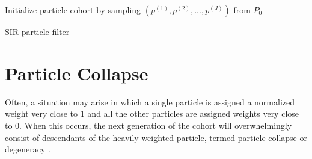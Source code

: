     \begin{algorithm}

        \BlankLine

        \DontPrintSemicolon


        \BlankLine

        Initialize particle cohort by sampling $(p^{(1)}, p^{(2)}, ..., p^{(J)})$ from $P_0$

        \BlankLine


        \BlankLine


        \BlankLine

        \caption{SIR particle filter \label{pfsir}}

    \end{algorithm}

\section{Particle Collapse}

	Often, a situation may arise in which a single particle is assigned a normalized weight very close to 1 and all the other particles are assigned weights very close to 0. When this occurs, the next generation of the cohort will overwhelmingly consist of descendants of the heavily-weighted particle, termed particle collapse or degeneracy \cite{Bengtsson2008}\cite{Arulampalam2002}.

